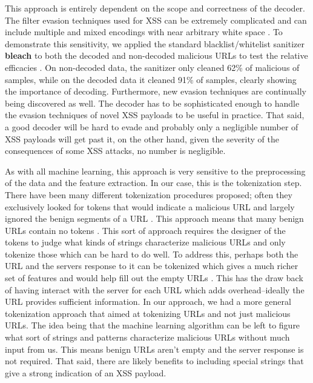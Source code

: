 This approach is entirely dependent on the scope and correctness of the decoder. The filter evasion techniques used for XSS can be extremely complicated and can include multiple and mixed encodings with near arbitrary white space \cite{xsscheat}. To demonstrate this sensitivity, we applied the standard blacklist/whitelist sanitizer \textbf{bleach} to both the decoded and non-decoded malicious URLs to test the relative efficacies \cite{bleach}. On non-decoded data, the sanitizer only cleaned 62\% of malicious of samples, while on the decoded data it cleaned 91\% of samples, clearly showing the importance of decoding. Furthermore, new evasion techniques are continually being discovered as well. The decoder has to be sophisticated enough to handle the evasion techniques of novel XSS payloads to be useful in practice. That said, a good decoder will be hard to evade and probably only a negligible number of XSS payloads will get past it, on the other hand, given the severity of the consequences of some XSS attacks, no number is negligible. 

As with all machine learning, this approach is very sensitive to the preprocessing of the data and the feature extraction. In our case, this is the tokenization step. There have been many different tokenization procedures proposed; often they exclusively looked for tokens that would indicate a malicious URL and largely ignored the benign segments of a URL \cite{fang2018deepxss}\cite{mokbal2019mlpxss}. This approach means that many benign URLs contain no tokens \cite{zhang2019cross}. This sort of approach requires the designer of the tokens to judge what kinds of strings characterize malicious URLs and only tokenize those which can be hard to do well. To address this, perhaps both the URL and the servers response to it can be tokenized which gives a much richer set of features and would help fill out the empty URLs \cite{zhang2019cross}. This has the draw back of having interact with the server for each URL which adds overhead--ideally the URL provides sufficient information. In our approach, we had a more general tokenization approach that aimed at tokenizing URLs and not just malicious URLs. The idea being that the machine learning algorithm can be left to figure what sort of strings and patterns characterize malicious URLs without much input from us. This means benign URLs aren't empty and the server response is not required. That said, there are likely benefits to including special strings that give a strong indication of an XSS payload. 